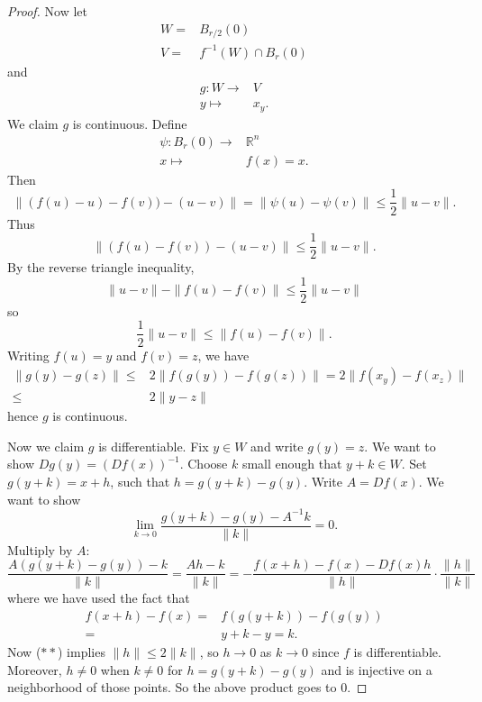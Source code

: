 \documentclass[12pt]{article}
\begin{document}
\begin{proof}
	Now let 
	\begin{align*}
		W =& B_{r/2}(0) \\
		V =& f^{-1}(W) \cap B_r(0)
	\end{align*}
	and 
	\begin{align*}
		g: W\to& V \\
		y \mapsto& x_y.
	\end{align*}
	We claim $g$ is continuous. Define 
	\begin{align*}
		\psi: B_r(0) \to& \mathbb{R}^n \\
		x \mapsto& f(x)=x.
	\end{align*}
	Then 
	\begin{equation*}
		\|(f(u)-u) - f(v)) - (u-v)\| = \|\psi(u)-\psi(v)\| \leq \frac{1}{2}\|u-v\|.
	\end{equation*}
	Thus 
	\begin{equation*}
		\|(f(u)-f(v)) - (u-v)\| \leq \frac{1}{2}\|u-v\|.
	\end{equation*}
	By the reverse triangle inequality,
	\begin{equation*}
		\|u-v\|-\|f(u)-f(v)\| \leq \frac{1}{2}\|u-v\|
	\end{equation*}
	so 
	\begin{equation*}
		\frac{1}{2}\|u-v\|\leq \|f(u)-f(v)\|.
	\end{equation*}
	Writing $f(u)=y$ and $f(v)=z$, we have 
	\begin{align*}
		\|g(y)-g(z)\| 
		\leq& 2\|f(g(y))-f(g(z))\| = 2\|f(x_y)-f(x_z)\| \\ 
		\leq& 2\|y-z\| \tag{$\ast\ast$}
	\end{align*}
	hence $g$ is continuous.

	Now we claim $g$ is differentiable. Fix $y\in W$ and write $g(y)=z$. We want to show $Dg(y)=(Df(x))^{-1}$. Choose $k$ small enough that $y+k\in W$. Set $g(y+k)=x+h$, such that $h=g(y+k)-g(y)$. Write $A=Df(x)$. We want to show 
	\begin{equation*}
		\lim_{k\to 0} \frac{g(y+k)-g(y)-A^{-1}k}{\|k\|} = 0.
	\end{equation*}
	Multiply by $A$:
	\begin{equation*}
		\frac{A(g(y+k)-g(y))-k}{\|k\|} = \frac{Ah-k}{\|k\|} = - \frac{f(x+h)-f(x)-Df(x)h}{\|h\|}\cdot \frac{\|h\|}{\|k\|}
	\end{equation*}
	where we have used the fact that 
	\begin{align*}
		f(x+h)-f(x) 
		=& f(g(y+k)) - f(g(y)) \\
		=& y+k-y = k.
	\end{align*}
	Now ($\ast\ast$) implies $\|h\|\leq 2\|k\|$, so $h\to 0$ as $k\to 0$ since $f$ is differentiable. Moreover, $h\neq 0$ when $k\neq 0$ for $h=g(y+k)-g(y)$ and is injective on a neighborhood of those points. So the above product goes to $0$.


\end{proof}
\end{document}
